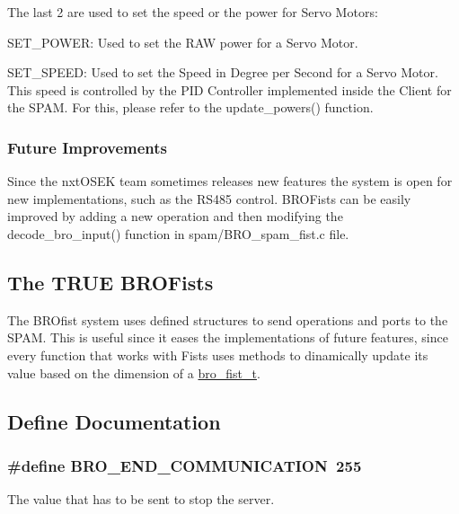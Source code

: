 The last 2 are used to set the speed or the power for Servo Motors:
\begin{DoxyItemize}
\item {\ttfamily SET\_\-POWER:} Used to set the RAW power for a Servo Motor.
\item {\ttfamily SET\_\-SPEED:} Used to set the Speed in Degree per Second for a Servo Motor. This speed is controlled by the PID Controller implemented inside the Client for the SPAM. For this, please refer to the update\_\-powers() function.
\end{DoxyItemize}\hypertarget{group___bro_fist_FutureImp}{}\subsubsection{Future Improvements}\label{group___bro_fist_FutureImp}
Since the nxtOSEK team sometimes releases new features the system is open for new implementations, such as the RS485 control. BROFists can be easily improved by adding a new operation and then modifying the decode\_\-bro\_\-input() function in spam/BRO\_\-spam\_\-fist.c file.\hypertarget{group___bro_fist_BroFistStruct}{}\subsection{The TRUE BROFists}\label{group___bro_fist_BroFistStruct}
The BROfist system uses defined structures to send operations and ports to the SPAM. This is useful since it eases the implementations of future features, since every function that works with Fists uses methods to dinamically update its value based on the dimension of a \hyperlink{structbro__fist__t}{bro\_\-fist\_\-t}. 

\subsection{Define Documentation}
\hypertarget{group___bro_fist_ga2bd586ea01c91051e9db186c12f4464b}{
\subsubsection[{BRO\_\-END\_\-COMMUNICATION}]{\setlength{\rightskip}{0pt plus 5cm}\#define BRO\_\-END\_\-COMMUNICATION~255}}
\label{group___bro_fist_ga2bd586ea01c91051e9db186c12f4464b}


The value that has to be sent to stop the server. 

